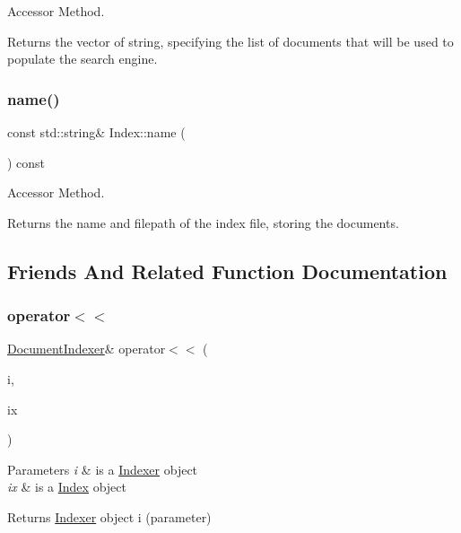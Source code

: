 Accessor Method. 

Returns the vector of string, specifying the list of documents that will be used to populate the search engine. \mbox{\label{class_index_a187d69bacb4870d4dff6b37584df0925}} 
\subsubsection{\texorpdfstring{name()}{name()}}
{\footnotesize\ttfamily const std\+::string\& Index\+::name (\begin{DoxyParamCaption}{ }\end{DoxyParamCaption}) const\hspace{0.3cm}{\ttfamily [inline]}}



Accessor Method. 

Returns the name and filepath of the index file, storing the documents. 

\subsection{Friends And Related Function Documentation}
\mbox{\label{class_index_a82199a005a825421b7db05a3c2547180}} 
\subsubsection{\texorpdfstring{operator$<$$<$}{operator<<}}
{\footnotesize\ttfamily \hyperlink{class_document_indexer}{Document\+Indexer}\& operator$<$$<$ (\begin{DoxyParamCaption}\item[{\hyperlink{class_document_indexer}{Document\+Indexer} \&}]{i,  }\item[{const \hyperlink{class_index}{Index} \&}]{ix }\end{DoxyParamCaption})\hspace{0.3cm}{\ttfamily [friend]}}


\begin{DoxyParams}{Parameters}
{\em i} & is a \hyperlink{class_indexer}{Indexer} object \\
\hline
{\em ix} & is a \hyperlink{class_index}{Index} object \\
\hline
\end{DoxyParams}
\begin{DoxyReturn}{Returns}
\hyperlink{class_indexer}{Indexer} object i (parameter) 
\end{DoxyReturn}


